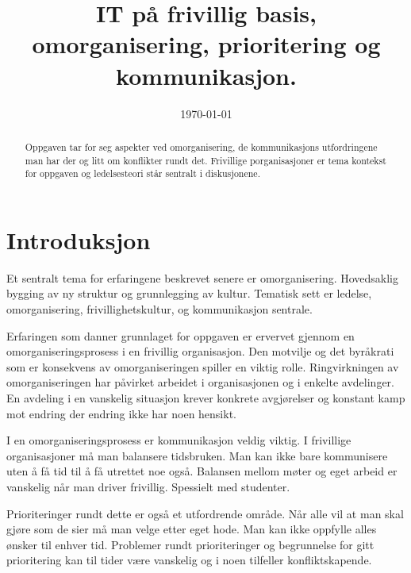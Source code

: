 \documentclass[12pt, a4paper]{article}
\title{
	IT på frivillig basis, omorganisering, prioritering og kommunikasjon.
}
\author{
}
\date{\today}
\begin{document}
\maketitle
{}

\begin{abstract}
Oppgaven tar for seg aspekter ved omorganisering, de kommunikasjons
utfordringene man har der og litt om konflikter rundt det. Frivillige
porganisasjoner er tema kontekst for oppgaven og ledelsesteori står sentralt i
diskusjonene.  
\end{abstract}

\tableofcontents
\clearpage

\renewcommand{\baselinestretch}{1.50}\normalsize
\section{Introduksjon}

Et sentralt tema for erfaringene beskrevet senere er omorganisering. Hovedsaklig
bygging av ny struktur og grunnlegging av kultur. Tematisk sett er ledelse,
omorganisering, frivillighetskultur, og kommunikasjon sentrale.  

Erfaringen som danner grunnlaget for oppgaven er ervervet gjennom en
omorganiseringsprosess i en frivillig organisasjon. Den motvilje og det
byråkrati som er konsekvens av omorganiseringen spiller en viktig rolle.
Ringvirkningen av omorganiseringen har påvirket arbeidet i organisasjonen og i
enkelte avdelinger. En avdeling i en vanskelig situasjon krever konkrete
avgjørelser og konstant kamp mot endring der endring ikke har noen hensikt.  

I en omorganiseringsprosess er kommunikasjon veldig viktig. I frivillige
organisasjoner må man balansere tidsbruken. Man kan ikke bare kommunisere uten
å få tid til å få utrettet noe også. Balansen mellom møter og eget arbeid er
vanskelig når man driver frivillig. Spessielt med studenter.

Prioriteringer rundt dette er også et utfordrende område. Når alle vil at man
skal gjøre som de sier må man velge etter eget hode. Man kan ikke oppfylle
alles ønsker til enhver tid. Problemer rundt prioriteringer og begrunnelse for
gitt prioritering kan til tider være vanskelig og i noen tilfeller
konfliktskapende.     
\end{document}
